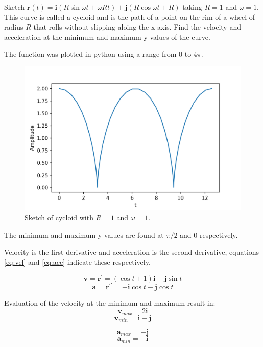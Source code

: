 Sketch $\boldsymbol{r}\left(t\right)=\boldsymbol{i}\left(R\sin \omega t +\omega Rt\right)+\boldsymbol{j}\left(R\cos \omega t +R\right)$ taking $R=1$ and $\omega=1$. This curve is called a cycloid and is the path of a point on the rim of a wheel of radius $R$ that rolls without slipping aloing the x-axis. Find the velocity and acceleration at the minimum and maximum y-values of the curve.

The function was plotted in python using a range from 0 to $4\pi$. 
\begin{figure}[h!]
	\centering
	\includegraphics[width=\linewidth]{cycloid.png}
	\caption{Sketch of cycloid with $R=1$ and $\omega=1$.}
\end{figure}

The minimum and maximum y-values are found at $\pi/2$ and 0 respectively.

Velocity is the first derivative and acceleration is the second derivative, equations \ref{eq:vel} and \ref{eq:acc} indicate these respectively.

\begin{equation}
	\boldsymbol{v}=\boldsymbol{r}^\prime=\left(\cos t +1\right)\boldsymbol{i}-\boldsymbol{j}\sin t
	\label{eq:vel}
\end{equation}
\begin{equation}
	\boldsymbol{a}=\boldsymbol{r}^{\prime\prime}=-\boldsymbol{i}\cos t-\boldsymbol{j}\cos t
	\label{eq:acc}
\end{equation}

Evaluation of the velocity at the minimum and maximum result in:
	\begin{equation*}
	\boxed{
			\boldsymbol{v}_{max} =2\boldsymbol{i}
			}
	\end{equation*}
		\begin{equation*}
	\boxed{
		\boldsymbol{v}_{min} = \boldsymbol{i}-\boldsymbol{j}	
			}
	\end{equation*}

\begin{equation*}
	\boxed{
			\boldsymbol{a}_{max}=-\boldsymbol{j}
	}
\end{equation*}
\begin{equation*}
	\boxed{
			\boldsymbol{a}_{min}=-\boldsymbol{i}
	}
\end{equation*}
